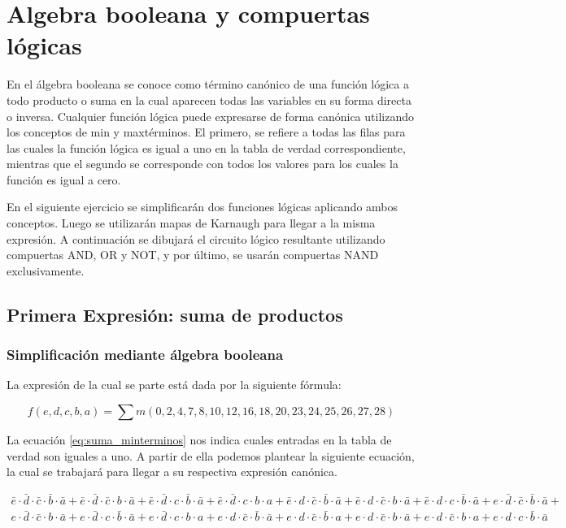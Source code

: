 \section{Algebra booleana y compuertas lógicas}

En el álgebra booleana se conoce como término canónico de una función lógica a todo producto o suma en la cual aparecen todas las variables en su forma directa o inversa. Cualquier función lógica puede expresarse de forma canónica utilizando los conceptos de min y maxtérminos. El primero, se refiere a todas las filas para las cuales la función lógica es igual a uno en la tabla de verdad correspondiente, mientras que el segundo se corresponde con todos los valores para los cuales la función es igual a cero. 

En el siguiente ejercicio se simplificarán dos funciones lógicas aplicando ambos conceptos. Luego se utilizarán mapas de Karnaugh para llegar a la misma expresión. A continuación se dibujará el circuito lógico resultante utilizando compuertas AND, OR y NOT, y por último, se usarán compuertas NAND exclusivamente.

\subsection{Primera Expresión: suma de productos}

\subsubsection{Simplificación mediante álgebra booleana}

La expresión de la cual se parte está dada por la siguiente fórmula:

\begin{equation}\label{eq:suma_minterminos}
f(e,d,c,b,a) = \sum{m(0, 2, 4, 7, 8, 10, 12, 16, 18, 20, 23, 24, 25, 26, 27, 28)}
\end{equation}

La ecuación \ref{eq:suma_minterminos} nos indica cuales entradas en la tabla de verdad son iguales a uno. A partir de ella podemos plantear la siguiente ecuación, la cual se trabajará para llegar a su respectiva expresión canónica.

\begin{multline}
\bar{e} \cdot \bar{d} \cdot \bar{c} \cdot \bar{b} \cdot \bar{a} + 
\bar{e} \cdot \bar{d} \cdot \bar{c} \cdot b \cdot \bar{a} +
\bar{e} 	\cdot \bar{d} \cdot c \cdot \bar{b} \cdot \bar{a} +
\bar{e} \cdot \bar{d} \cdot c \cdot b \cdot a + 
\bar{e} \cdot d \cdot \bar{c} \cdot \bar{b} \cdot \bar{a} + 
\bar{e} \cdot d \cdot \bar{c} \cdot b \cdot \bar{a} + 
\bar{e} \cdot d \cdot c \cdot \bar{b} \cdot \bar{a} + 
e \cdot \bar{d} \cdot \bar{c} \cdot \bar{b} \cdot \bar{a} + \\
e \cdot \bar{d} \cdot \bar{c} \cdot b \cdot \bar{a} + 
e \cdot \bar{d} \cdot c \cdot \bar{b} \cdot \bar{a} + 		
e \cdot \bar{d} \cdot c \cdot b \cdot a + 
e \cdot d \cdot \bar{c} \cdot \bar{b} \cdot \bar{a} + 
e \cdot d \cdot \bar{c} \cdot \bar{b} \cdot a + 
e \cdot d \cdot \bar{c} \cdot b \cdot \bar{a} + 
e \cdot d \cdot \bar{c} \cdot b \cdot a +
e \cdot d \cdot c \cdot \bar{b} \cdot \bar{a} 
\end{multline}


